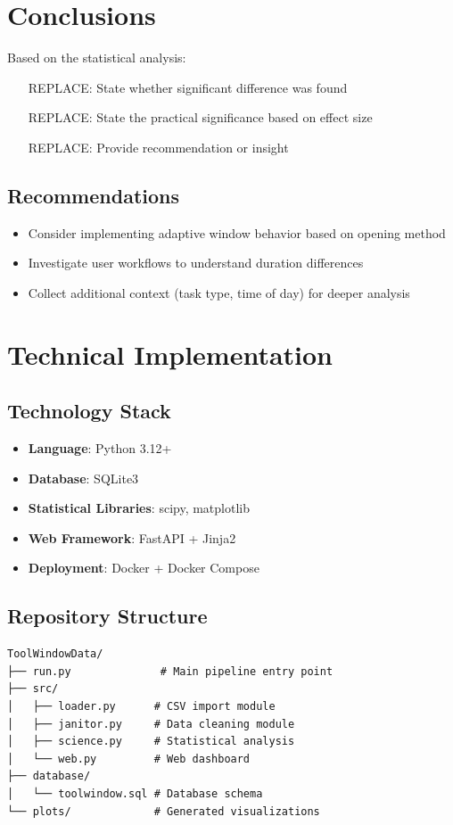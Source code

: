 \documentclass[12pt,a4paper]{article}
\begin{document}
\section{Conclusions}

Based on the statistical analysis:
\begin{enumerate}
    \item [REPLACE: State whether significant difference was found]
    \item [REPLACE: State the practical significance based on effect size]
    \item [REPLACE: Provide recommendation or insight]
\end{enumerate}

\subsection{Recommendations}
\begin{itemize}
    \item Consider implementing adaptive window behavior based on opening method
    \item Investigate user workflows to understand duration differences
    \item Collect additional context (task type, time of day) for deeper analysis
\end{itemize}

\section{Technical Implementation}

\subsection{Technology Stack}
\begin{itemize}
    \item \textbf{Language}: Python 3.12+
    \item \textbf{Database}: SQLite3
    \item \textbf{Statistical Libraries}: scipy, matplotlib
    \item \textbf{Web Framework}: FastAPI + Jinja2
    \item \textbf{Deployment}: Docker + Docker Compose
\end{itemize}

\subsection{Repository Structure}
\begin{verbatim}
ToolWindowData/
├── run.py              # Main pipeline entry point
├── src/
│   ├── loader.py      # CSV import module
│   ├── janitor.py     # Data cleaning module
│   ├── science.py     # Statistical analysis
│   └── web.py         # Web dashboard
├── database/
│   └── toolwindow.sql # Database schema
└── plots/             # Generated visualizations
\end{verbatim}
\end{document}
